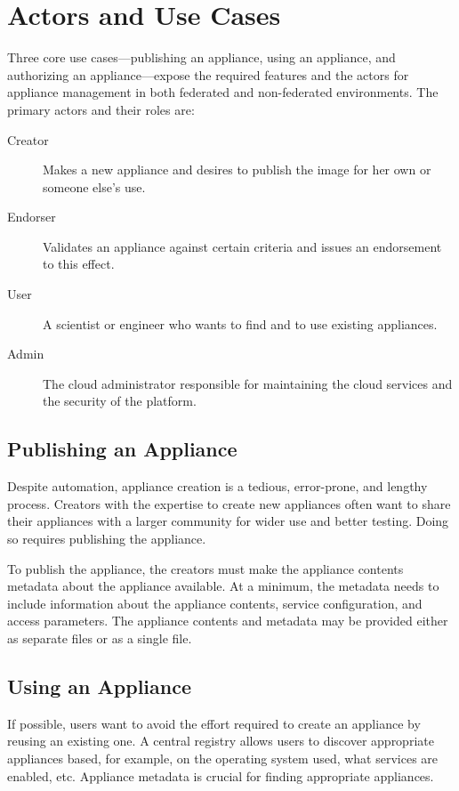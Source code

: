 \section{Actors and Use Cases}
\label{sec:use-cases}

Three core use cases---publishing an appliance, using an appliance,
and authorizing an appliance---expose the required features and the
actors for appliance management in both federated and non-federated
environments.  The primary actors and their roles are:
\begin{description}
\item[Creator] Makes a new appliance and desires to publish the image
  for her own or someone else's use.
\item[Endorser] Validates an appliance against certain criteria and
  issues an endorsement to this effect.
\item[User] A scientist or engineer who wants to find and to use
  existing appliances.
\item[Admin] The cloud administrator responsible for
  maintaining the cloud services and the security of the platform.
\end{description}

\subsection{Publishing an Appliance}

Despite automation, appliance creation is a tedious, error-prone, and
lengthy process.  Creators with the expertise to create new
appliances often want to share their appliances with a larger
community for wider use and better testing.  Doing so requires
publishing the appliance.

To publish the appliance, the creators must make the appliance
contents metadata about the appliance available.  At a minimum, the
metadata needs to include information about the appliance contents,
service configuration, and access parameters.  The appliance contents
and metadata may be provided either as separate files or as a single
file.

\subsection{Using an Appliance}

If possible, users want to avoid the effort required to create an
appliance by reusing an existing one.  A central registry allows users
to discover appropriate appliances based, for example, on the
operating system used, what services are enabled, etc.  Appliance
metadata is crucial for finding appropriate appliances.

